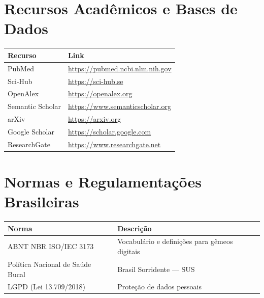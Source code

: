 \section{Recursos Acadêmicos e Bases de Dados}

\begin{tabularx}{\textwidth}{|l|X|}
\hline
\textbf{Recurso} & \textbf{Link} \\
\hline
PubMed & \url{https://pubmed.ncbi.nlm.nih.gov} \\
\hline
Sci-Hub & \url{https://sci-hub.se} \\
\hline
OpenAlex & \url{https://openalex.org} \\
\hline
Semantic Scholar & \url{https://www.semanticscholar.org} \\
\hline
arXiv & \url{https://arxiv.org} \\
\hline
Google Scholar & \url{https://scholar.google.com} \\
\hline
ResearchGate & \url{https://www.researchgate.net} \\
\hline
\end{tabularx}

\section{Normas e Regulamentações Brasileiras}

\begin{tabularx}{\textwidth}{|l|X|}
\hline
\textbf{Norma} & \textbf{Descrição} \\
\hline
ABNT NBR ISO/IEC 3173 & Vocabulário e definições para gêmeos digitais \\
\hline
Política Nacional de Saúde Bucal & Brasil Sorridente — SUS \\
\hline
LGPD (Lei 13.709/2018) & Proteção de dados pessoais \\
\hline
\end{tabularx}
